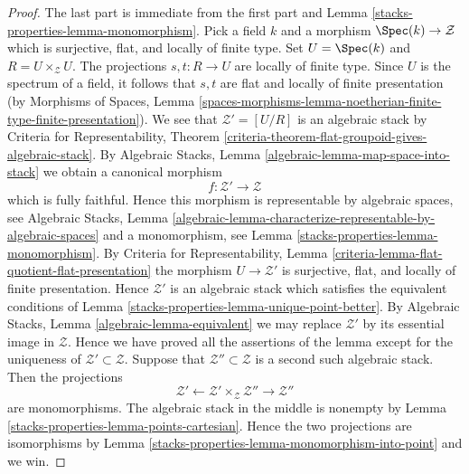 \begin{proof}
The last part is immediate from the first part and
Lemma \ref{stacks-properties-lemma-monomorphism}.
Pick a field $k$ and a morphism $\Spec(k) \to \mathcal{Z}$
which is surjective, flat, and locally of finite type.
Set $U = \Spec(k)$ and $R = U \times_\mathcal{Z} U$.
The projections $s, t : R \to U$ are locally of finite type.
Since $U$ is the spectrum of a field, it follows that
$s, t$ are flat and locally of finite presentation (by
Morphisms of Spaces, Lemma
\ref{spaces-morphisms-lemma-noetherian-finite-type-finite-presentation}).
We see that $\mathcal{Z}' = [U/R]$ is an algebraic stack by
Criteria for Representability,
Theorem \ref{criteria-theorem-flat-groupoid-gives-algebraic-stack}.
By
Algebraic Stacks, Lemma \ref{algebraic-lemma-map-space-into-stack}
we obtain a canonical morphism
$$
f : \mathcal{Z}' \longrightarrow \mathcal{Z}
$$
which is fully faithful. Hence this morphism is representable by
algebraic spaces, see
Algebraic Stacks, Lemma
\ref{algebraic-lemma-characterize-representable-by-algebraic-spaces}
and a monomorphism, see
Lemma \ref{stacks-properties-lemma-monomorphism}.
By
Criteria for Representability,
Lemma \ref{criteria-lemma-flat-quotient-flat-presentation}
the morphism $U \to \mathcal{Z}'$ is surjective, flat, and locally of finite
presentation. Hence $\mathcal{Z}'$ is an algebraic stack which satisfies
the equivalent conditions of
Lemma \ref{stacks-properties-lemma-unique-point-better}.
By
Algebraic Stacks, Lemma \ref{algebraic-lemma-equivalent}
we may replace $\mathcal{Z}'$ by its essential image in $\mathcal{Z}$.
Hence we have proved all the assertions of the lemma except for the
uniqueness of $\mathcal{Z}' \subset \mathcal{Z}$. Suppose that
$\mathcal{Z}'' \subset \mathcal{Z}$ is a second such algebraic stack.
Then the projections
$$
\mathcal{Z}'
\longleftarrow
\mathcal{Z}' \times_\mathcal{Z} \mathcal{Z}''
\longrightarrow
\mathcal{Z}''
$$
are monomorphisms. The algebraic stack in the middle is nonempty by
Lemma \ref{stacks-properties-lemma-points-cartesian}.
Hence the two projections are isomorphisms by
Lemma \ref{stacks-properties-lemma-monomorphism-into-point}
and we win.
\end{proof}

